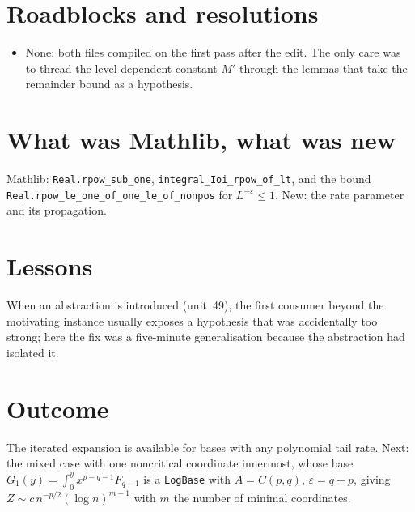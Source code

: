 \documentclass[11pt]{article}
\begin{document}
\section{Roadblocks and resolutions}
\begin{itemize}
\item None: both files compiled on the first pass after the edit. The only care was to thread the
level-dependent constant $M'$ through the lemmas that take the remainder bound as a hypothesis.
\end{itemize}

\section{What was Mathlib, what was new}
Mathlib: \texttt{Real.rpow\_sub\_one}, \texttt{integral\_Ioi\_rpow\_of\_lt}, and the bound
\texttt{Real.rpow\_le\_one\_of\_one\_le\_of\_nonpos} for $L^{-\varepsilon}\le1$. New: the rate
parameter and its propagation.

\section{Lessons}
When an abstraction is introduced (unit~49), the first consumer beyond the motivating instance usually
exposes a hypothesis that was accidentally too strong; here the fix was a five-minute generalisation
because the abstraction had isolated it.

\section{Outcome}
The iterated expansion is available for bases with any polynomial tail rate. Next: the mixed case
with one noncritical coordinate innermost, whose base $G_1(y)=\int_0^yx^{p-q-1}F_{q-1}$ is a
\texttt{LogBase} with $A=C(p,q)$, $\varepsilon=q-p$, giving $Z\sim c\,n^{-p/2}(\log n)^{m-1}$ with
$m$ the number of minimal coordinates.
\end{document}
